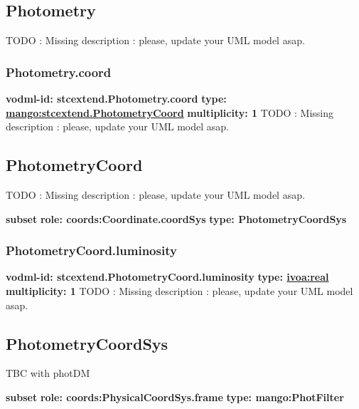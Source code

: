   \subsection{Photometry}
  \label{sect:stcextend.Photometry}
    TODO : Missing description : please, update your UML model asap.

    \subsubsection{Photometry.coord}
      \textbf{vodml-id: stcextend.Photometry.coord} \newline
      \textbf{type: \hyperref[sect:stcextend.PhotometryCoord]{mango:stcextend.PhotometryCoord}} \newline
      \textbf{multiplicity: 1} \newline 
      TODO : Missing description : please, update your UML model asap.

  \subsection{PhotometryCoord}
  \label{sect:stcextend.PhotometryCoord}
    TODO : Missing description : please, update your UML model asap.

    \noindent \textbf{subset} \newline
    \indent   \textbf{role: coords:Coordinate.coordSys} \newline
    \indent   \textbf{type: PhotometryCoordSys} \newline


    \subsubsection{PhotometryCoord.luminosity}
      \textbf{vodml-id: stcextend.PhotometryCoord.luminosity} \newline
      \textbf{type: \hyperref[sect:ivoa]{ivoa:real}} \newline
      \textbf{multiplicity: 1} \newline 
      TODO : Missing description : please, update your UML model asap.

  \subsection{PhotometryCoordSys}
  \label{sect:stcextend.PhotometryCoordSys}
    TBC with photDM

    \noindent \textbf{subset} \newline
    \indent   \textbf{role: coords:PhysicalCoordSys.frame} \newline
    \indent   \textbf{type: mango:PhotFilter} \newline


